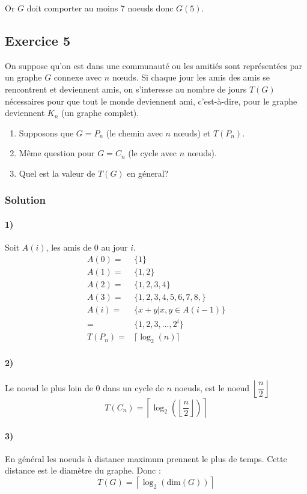 Or $G$ doit comporter au moins 7 noeuds donc $G(5)$.



\subsection*{Exercice 5}
On suppose qu'on est dans une communaut\'{e} ou les amiti\'{e}s sont repr\'{e}sent\'{e}es par un graphe $G$ connexe avec $n$ n\oe{}uds. 
Si chaque jour les amis des amis se rencontrent et deviennent amis, on s'interesse au nombre de jours $T(G)$ n\'{e}cessaires
pour que tout le monde deviennent ami, c'est-\`{a}-dire, pour le graphe deviennent $K_n$ (un graphe complet).
\begin{enumerate}
\item Supposons que $G = P_n$ (le chemin avec $n$ n\oe{}uds) et $T(P_n)$.
\item M\^{e}me question pour $G = C_n$ (le cycle avec $n$ n\oe{}uds).
\item Quel est la valeur de $T(G)$ en g\'{e}neral?
\end{enumerate}

\subsubsection*{Solution}
\paragraph{1)} Soit $A(i)$, les amis de $0$ au jour $i$.
\begin{align*}
    A(0) =& \{1 \} \\
    A(1) =& \{1,2 \}\\
    A(2) =& \{1,2,3,4 \}\\
    A(3) =& \{1,2,3,4,5,6,7,8, \}\\
    A(i) =& \{x+y | x,y \in A(i-1) \} \\
         =& \{1,2,3,..., 2^i \} \\
    T(P_n) =& \lceil \log_2 (n) \rceil
\end{align*}

\paragraph{2)} Le noeud le plus loin de $0$ dans un cycle de $n$ noeuds, est le noeud $\left\lfloor \dfrac{n}{2} \right\rfloor$
$$ T(C_n) = \left\lceil \log_2 \left(\left\lfloor \dfrac{n}{2} \right\rfloor \right) \right\rceil $$
\paragraph{3)} En général les noeuds à distance maximum prennent le plus de temps. Cette distance est le diamètre du graphe. Donc : 
$$ T(G) = \left\lceil \log_2 \left( \text{dim}(G) \right) \right\rceil $$

